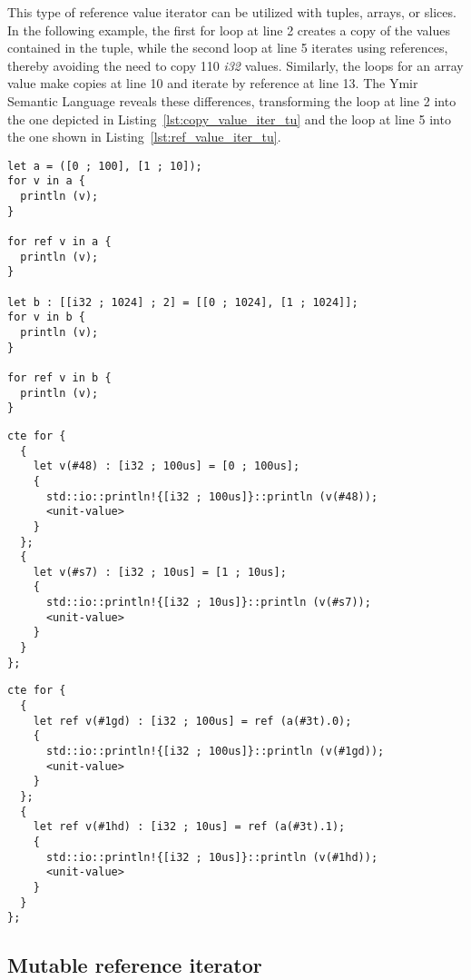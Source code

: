 This type of reference value iterator can be utilized with tuples, arrays, or
slices. In the following example, the first for loop at line 2 creates a copy of
the values contained in the tuple, while the second loop at line 5 iterates
using references, thereby avoiding the need to copy 110 \textit{i32} values.
Similarly, the loops for an array value make copies at line 10 and iterate by
reference at line 13. The Ymir Semantic Language reveals these differences,
transforming the loop at line 2 into the one depicted in
Listing~\ref{lst:copy_value_iter_tu} and the loop at line 5 into the one shown
in Listing~\ref{lst:ref_value_iter_tu}.

\begin{lstlisting}[style=coloredverbatim, caption=iteration using reference value iterator, label=lst:ref_value_iter_ex]
let a = ([0 ; 100], [1 ; 10]);
for v in a {
  println (v);
}

for ref v in a {
  println (v);
}

let b : [[i32 ; 1024] ; 2] = [[0 ; 1024], [1 ; 1024]];
for v in b {
  println (v);
}

for ref v in b {
  println (v);
}
\end{lstlisting}

\begin{lstlisting}[style=intermediateVerb, caption=By copy iteration on a tuple, label=lst:copy_value_iter_tu]
cte for {
  {
    let v(#48) : [i32 ; 100us] = [0 ; 100us];
    {
      std::io::println!{[i32 ; 100us]}::println (v(#48));
      <unit-value>
    }
  };
  {
    let v(#s7) : [i32 ; 10us] = [1 ; 10us];
    {
      std::io::println!{[i32 ; 10us]}::println (v(#s7));
      <unit-value>
    }
  }
};
\end{lstlisting}

\begin{lstlisting}[style=intermediateVerb, caption=By reference iteration on a tuple, label=lst:ref_value_iter_tu]
cte for {
  {
    let ref v(#1gd) : [i32 ; 100us] = ref (a(#3t).0);
    {
      std::io::println!{[i32 ; 100us]}::println (v(#1gd));
      <unit-value>
    }
  };
  {
    let ref v(#1hd) : [i32 ; 10us] = ref (a(#3t).1);
    {
      std::io::println!{[i32 ; 10us]}::println (v(#1hd));
      <unit-value>
    }
  }
};
\end{lstlisting}

\subsection{Mutable reference iterator}


